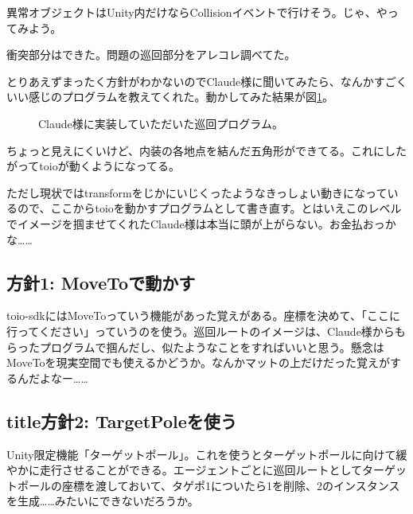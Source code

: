 \documentclass[fleqn,twocolumn]{mynote}
\begin{document}
異常オブジェクトはUnity内だけならCollisionイベントで行けそう。じゃ、やってみよう。

衝突部分はできた。問題の巡回部分をアレコレ調べてた。

とりあえずまったく方針がわかないのでClaude様に聞いてみたら、なんかすごくいい感じのプログラムを教えてくれた。動かしてみた結果が図\ref{fig:patrol-draft}。

\fboxsep=0pt            %
\fboxrule=1pt            %
\begin{figure}[h]
  \centering
  \caption{Claude様に実装していただいた巡回プログラム。}
  \label{fig:patrol-draft}
\end{figure}

ちょっと見えにくいけど、内装の各地点を結んだ五角形ができてる。これにしたがってtoioが動くようになってる。

ただし現状ではtransformをじかにいじくったようなきっしょい動きになっているので、ここからtoioを動かすプログラムとして書き直す。とはいえこのレベルでイメージを掴ませてくれたClaude様は本当に頭が上がらない。お金払おっかな……

\subsection*{方針1: MoveToで動かす}
toio-sdkにはMoveToっていう機能があった覚えがある。座標を決めて、「ここに行ってください」っていうのを使う。巡回ルートのイメージは、Claude様からもらったプログラムで掴んだし、似たようなことをすればいいと思う。懸念はMoveToを現実空間でも使えるかどうか。なんかマットの上だけだった覚えがするんだよなー……

\subsection*{title方針2: TargetPoleを使う}
Unity限定機能「ターゲットポール」。これを使うとターゲットポールに向けて緩やかに走行させることができる。エージェントごとに巡回ルートとしてターゲットポールの座標を渡しておいて、タゲポ1についたら1を削除、2のインスタンスを生成……みたいにできないだろうか。
\end{document}
